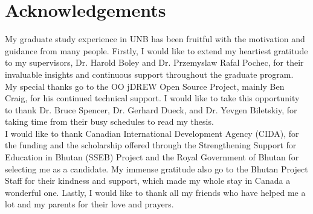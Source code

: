 \chapter*{Acknowledgements}
 \doublespacing

\hspace{0.3in}My graduate study experience in UNB has been fruitful with the motivation and guidance from many people.  Firstly, I would like to extend my heartiest gratitude to my supervisors, Dr. Harold Boley and Dr. Przemyslaw Rafal Pochec, for their invaluable insights and continuous support throughout the graduate program.\\

\hspace{0.3in}My special thanks go to the OO jDREW Open Source Project, mainly Ben Craig, for his continued technical support. I would like to take this opportunity to thank Dr. Bruce Spencer, Dr. Gerhard Dueck, and Dr. Yevgen Biletskiy, for taking time from their busy schedules to read my thesis.\\

\hspace{0.3in}I would like to thank Canadian International Development Agency (CIDA), for the funding and the scholarship offered through the Strengthening Support for Education in Bhutan (SSEB) Project and the Royal Government of Bhutan for selecting me as a candidate. My immense gratitude also go to the Bhutan Project Staff for their kindness and support, which made my whole stay in Canada a wonderful one. Lastly, I would like to thank all my friends who have helped me a lot and my parents for their love and prayers.
